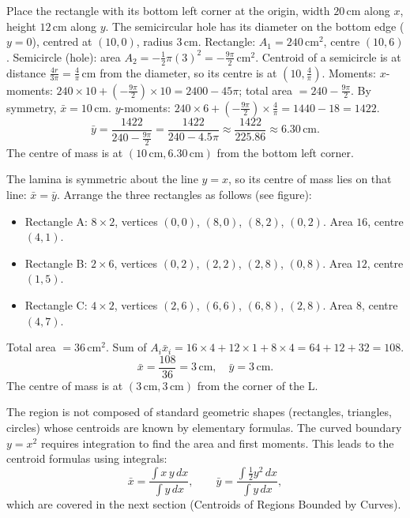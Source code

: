 \documentclass[11pt]{article}
\begin{document}
\begin{corrige}[Exercise 2]
Place the rectangle with its bottom left corner at the origin, width $20\,\text{cm}$ along $x$, height $12\,\text{cm}$ along $y$. The semicircular hole has its diameter on the bottom edge ($y=0$), centred at $(10,0)$, radius $3\,\text{cm}$.
Rectangle: $A_1 = 240\,\text{cm}^2$, centre $(10,6)$.
Semicircle (hole): area $A_2 = -\frac{1}{2}\pi(3)^2 = -\frac{9\pi}{2}\,\text{cm}^2$. Centroid of a semicircle is at distance $\frac{4r}{3\pi} = \frac{4}{\pi}\,\text{cm}$ from the diameter, so its centre is at $(10, \frac{4}{\pi})$.
Moments:
$x$-moments: $240\times10 + (-\frac{9\pi}{2})\times10 = 2400 - 45\pi$; total area $= 240 - \frac{9\pi}{2}$.
By symmetry, $\bar{x} = 10\,\text{cm}$.
$y$-moments: $240\times6 + (-\frac{9\pi}{2})\times\frac{4}{\pi} = 1440 - 18 = 1422$.
\[
\bar{y} = \frac{1422}{240 - \frac{9\pi}{2}} = \frac{1422}{240 - 4.5\pi} \approx \frac{1422}{225.86} \approx 6.30\,\text{cm}.
\]
The centre of mass is at $(10\,\text{cm}, 6.30\,\text{cm})$ from the bottom left corner.
\end{corrige}

\begin{corrige}[Exercise 3]
The lamina is symmetric about the line $y=x$, so its centre of mass lies on that line: $\bar{x} = \bar{y}$.
Arrange the three rectangles as follows (see figure):
\begin{itemize}
\item Rectangle A: $8\times2$, vertices $(0,0)$, $(8,0)$, $(8,2)$, $(0,2)$. Area $16$, centre $(4,1)$.
\item Rectangle B: $2\times6$, vertices $(0,2)$, $(2,2)$, $(2,8)$, $(0,8)$. Area $12$, centre $(1,5)$.
\item Rectangle C: $4\times2$, vertices $(2,6)$, $(6,6)$, $(6,8)$, $(2,8)$. Area $8$, centre $(4,7)$.
\end{itemize}
Total area $= 36\,\text{cm}^2$.
Sum of $A_i\bar{x}_i = 16\times4 + 12\times1 + 8\times4 = 64+12+32 = 108$.
\[
\bar{x} = \frac{108}{36} = 3\,\text{cm}, \quad \bar{y} = 3\,\text{cm}.
\]
The centre of mass is at $(3\,\text{cm}, 3\,\text{cm})$ from the corner of the L.
\end{corrige}

\begin{corrige}[Exercise 4]
The region is not composed of standard geometric shapes (rectangles, triangles, circles) whose centroids are known by elementary formulas. The curved boundary $y=x^2$ requires integration to find the area and first moments. This leads to the centroid formulas using integrals:
\[
\bar{x} = \frac{\int x\,y\,dx}{\int y\,dx}, \qquad \bar{y} = \frac{\int \frac{1}{2}y^2\,dx}{\int y\,dx},
\]
which are covered in the next section (Centroids of Regions Bounded by Curves).
\end{corrige}
\end{document}
